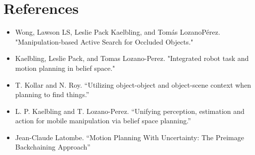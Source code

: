 \documentclass{article}
\begin{document}
\section{References}
\begin{itemize}
\item Wong, Lawson LS, Leslie Pack Kaelbling, and Tomás LozanoPérez. "Manipulation-based Active Search for Occluded Objects."
\item Kaelbling, Leslie Pack, and Tomas Lozano-Perez. "Integrated robot task and motion planning in belief space."
\item T. Kollar and N. Roy. “Utilizing object-object and object-scene context when planning to find things.”
\item L. P. Kaelbling and T. Lozano-Perez. “Unifying perception, estimation and action for mobile manipulation via belief space planning.”
\item Jean-Claude Latombe. “Motion Planning With Uncertainty: The Preimage Backchaining Approach”
\end{itemize}
\end{document}
